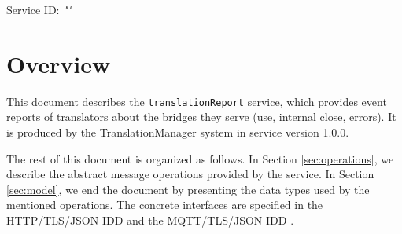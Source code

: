 \documentclass[a4paper]{arrowhead}
\begin{document}
\sloppy

\ArrowheadSetup

\begin{center}
  \vspace*{1cm}
  \huge{\arrowtitle}

  \vspace*{0.2cm}
  \LARGE{\arrowtype}
  \vspace*{1cm}

  \Large{Service ID: \textit{"\arrowid"}}

  \vspace*{\fill}


  \vspace*{1cm}
  \vspace*{\fill}

  \begin{abstract}
    This document describes the \texttt{translationReport} service, version 1.0.0, produced by the TranslationManager support system of Arrowhead 5.2.2.
  \end{abstract}

  \vspace*{1cm}
\end{center}

\newpage

\tableofcontents
\newpage

\section{Overview}
\label{sec:overview}

This document describes the \texttt{translationReport} service, which provides event reports of translators about the bridges they serve (use, internal close, errors).
It is produced by the TranslationManager system \cite{tm-sysd} in service version 1.0.0.

The rest of this document is organized as follows.
In Section \ref{sec:operations}, we describe the abstract message operations provided by the service.
In Section \ref{sec:model}, we end the document by presenting the data types used by the mentioned operations.
The concrete interfaces are specified in the HTTP/TLS/JSON IDD \cite{tm-translationReport-http-idd} and the MQTT/TLS/JSON IDD \cite{tm-translationReport-mqtt-idd}.
\end{document}
